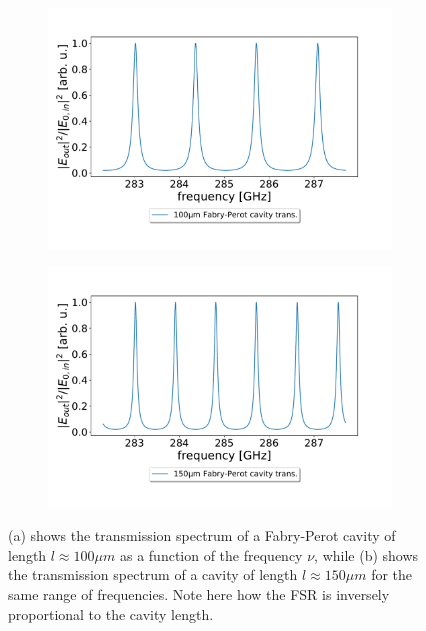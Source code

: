 \begin{figure}[h!]
    \centering
    \begin{subfigure}[b]{0.49\textwidth}
        \includegraphics[width=\textwidth]{figures/100um_fabry_perot_trans_vs_freq.pdf}
        \caption{}
    \end{subfigure}
    \begin{subfigure}[b]{0.49\textwidth}
        \includegraphics[width=\textwidth]{figures/150um_fabry_perot_trans_vs_freq.pdf}
        \caption{}
    \end{subfigure}
    \caption{(a) shows the transmission spectrum of a Fabry-Perot cavity of length $l \approx 100 \mu m$ as a function of the frequency $\nu$, while (b) shows the transmission spectrum of a cavity of length $l \approx 150 \mu m$ for the same range of frequencies. Note here how the FSR is inversely proportional to the cavity length.}
    \label{fig:fabry_perot_FSR_comparison}
\end{figure}

